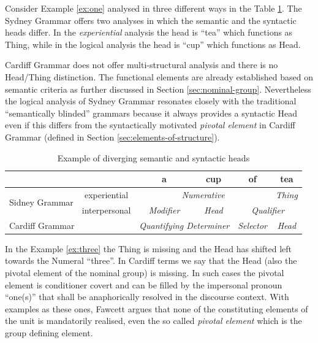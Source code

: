 Consider Example \ref{ex:one} analysed in three different ways in the Table \ref{tab:the-head-differences}. The Sydney Grammar offers two analyses in which the semantic and the syntactic heads differ. In the \textit{experiential} analysis the head is ``tea'' which functions as Thing, while in the logical analysis the head is ``cup'' which functions as Head. 

Cardiff Grammar does not offer multi-structural analysis and there is no Head/Thing distinction. The functional elements are already established based on semantic criteria as further discussed in Section \ref{sec:nominal-group}. Nevertheless the logical analysis of Sydney Grammar resonates closely with the traditional ``semantically blinded'' grammars because it always provides a syntactic Head even if this differs from the syntactically motivated \textit{pivotal element} in Cardiff Grammar (defined in Section \ref{sec:elements-of-structure}). 
 

\begin{table}[h]
	\centering
	\begin{tabular}{|c|c|c|c|c|c|}
		\hline
		\multicolumn{2}{|c|}{} & \textbf{a} & \textbf{cup} & \textbf{of} & \textbf{tea} \\ \hline
		\multirow{2}{*}{Sidney Grammar} & experiential & \multicolumn{3}{c|}{\textit{Numerative}} & \textit{Thing} \\ \cline{2-6} 
		& interpersonal & \textit{Modifier} & \textit{Head} & \multicolumn{2}{c|}{\textit{Qualifier}} \\ \hline
		\multicolumn{2}{|l|}{Cardiff Grammar} & \multicolumn{2}{c|}{\textit{Quantifying Determiner}} & \textit{Selector} & \textit{Head} \\ \hline
	\end{tabular}
	\caption{Example of diverging semantic and syntactic heads}
	\label{tab:the-head-differences}
\end{table}


In the Example \ref{ex:three} the Thing is missing and the Head has shifted left towards the Numeral ``three''. In Cardiff terms we say that the Head (also the pivotal element of the nominal group) is missing. In such cases the pivotal element is conditioner covert and can be filled by the impersonal pronoun ``one(s)'' that shall be anaphorically resolved in the discourse context. With examples as these ones, Fawcett argues that none of the constituting elements of the unit is mandatorily realised, even the so called \textit{pivotal element} which is the group defining element. 

